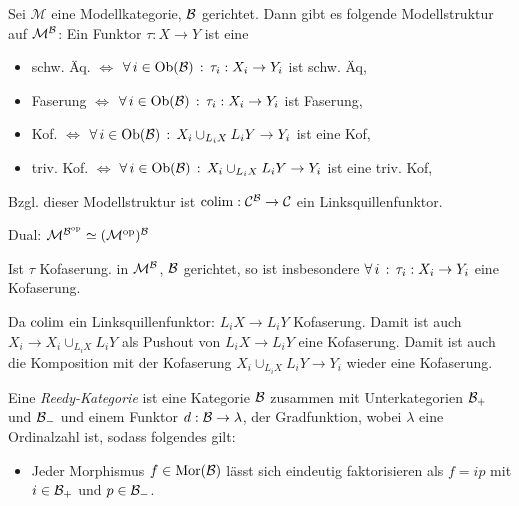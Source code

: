\documentclass{cheat-sheet}
\newcommand{\ModC}{\mathcal{M}} %
\begin{document}
\begin{satz}
  Sei $\ModC$ eine Modellkategorie, $\mathcal{B}$ gerichtet.
  Dann gibt es folgende Modellstruktur auf $\ModC^\Bat$: Ein Funktor $\tau : X \to Y$ ist eine
  \begin{itemize}
    \item schw. Äq. $\iff$ $\forall \, {i \in \operatorname{Ob}(\mathcal{B})} \,:\, \tau_i : X_i \to Y_i$ ist schw. Äq,
    \item Faserung $\iff$ $\forall \, {i \in \operatorname{Ob}(\mathcal{B})} \,:\, \tau_i : X_i \to Y_i$ ist Faserung,
    \item Kof. $\iff$ $\forall \, {i \in \operatorname{Ob}(\mathcal{B})} \,:\, X_i \cup_{L_i X} L_i Y \to Y_i$ ist eine Kof,
    \item triv. Kof. $\iff$ $\forall \, {i \in \operatorname{Ob}(\mathcal{B})} \,:\, X_i \cup_{L_i X} L_i Y \to Y_i$ ist eine triv. Kof,
  \end{itemize}
  Bzgl. dieser Modellstruktur ist $\operatorname{colim} : \mathcal{C}^{\mathcal{B}} \to \mathcal{C}$ ein Linksquillenfunktor.
\end{satz}

\begin{bem}
  Dual: $\ModC^{\Bat^\op} \simeq (\ModC^\op)^\Bat$
\end{bem}

\begin{bem}
  Ist $\tau$ Kofaserung. in $\ModC^\Bat$, $\mathcal{B}$ gerichtet, so ist insbesondere $\forall \, {i} \,:\, \tau_i : X_i \to Y_i$ eine Kofaserung.
\end{bem}

\begin{beweis}
  Da $\operatorname{colim}$ ein Linksquillenfunktor: $L_i X \to L_i Y$ Kofaserung.
  Damit ist auch $X_i \to X_i \cup_{L_i X} L_i Y$ als Pushout von $L_i X \to L_i Y$ eine Kofaserung.
  Damit ist auch die Komposition mit der Kofaserung $X_i \cup_{L_i X} L_i Y \to Y_i$ wieder eine Kofaserung.
\end{beweis}


\begin{defn}
  Eine \emph{Reedy-Kategorie} ist eine Kategorie $\mathcal{B}$ zusammen mit Unterkategorien $\mathcal{B}_{+}$ und $\mathcal{B}_{-}$ und einem Funktor $d : \mathcal{B} \to \lambda$, der Gradfunktion, wobei $\lambda$ eine Ordinalzahl ist, sodass folgendes gilt:
  \begin{itemize}
    \item Jeder Morphismus $f \in \operatorname{Mor}(\mathcal{B})$ lässt sich eindeutig faktorisieren als $f = ip$ mit $i \in \mathcal{B}_{+}$ und $p \in \mathcal{B}_{-}$.
  \end{itemize}
\end{defn}
\end{document}

